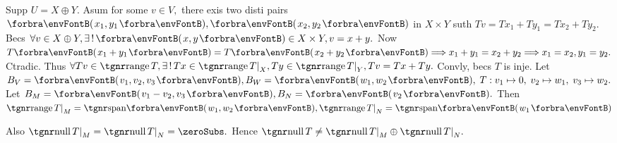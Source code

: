 Supp $U=X\oplus Y.$ Asum for some $v\in V,$ there exis two disti pairs $\Par{x_1,y_1},\Par{x_2,y_2}$ in $X\times Y$\parSol{}
suth $Tv=Tx_1+Ty_1=Tx_2+Ty_2.$ Becs $\forall v\in X\oplus Y,\exists\,!\,\Par{x,y}\in X\times Y,v=x+y.$\parSol{}
Now $T\Par{x_1+y_1}=T\Par{x_2+y_2}\Longrightarrow x_1+y_1=x_2+y_2\Longrightarrow x_1=x_2,y_1=y_2.$ Ctradic.\parSol{}
Thus $\forall Tv\in\range T,\exists\,!\,Tx\in\range T\mmid_X,Ty\in\range T\mmid_Y,Tv=Tx+Ty.$ Convly, becs $T$ is inje.\PfEnd\vspace{2pt}
\AExa Let $B_V=\Par{v_1,v_2,v_3},B_W=\Par{w_1,w_2},\;T:v_1\mapsto 0,\;v_2\mapsto w_1,\;v_3\mapsto w_2.$\parExa
Let $B_M=\Par{v_1-v_2,v_3},B_N=\Par{v_2}.$ Then $\range T\mmid_M=\Span{w_1,w_2},\range T\mmid_N=\Span{w_1}$\par\vspace{2pt}
\AComm Also $\null T\mmid_M=\null T\mmid_N=\zeroSubs.$ Hence $\null T\neq\null T\mmid_M\oplus\null T\mmid_N.$
\SepLine

